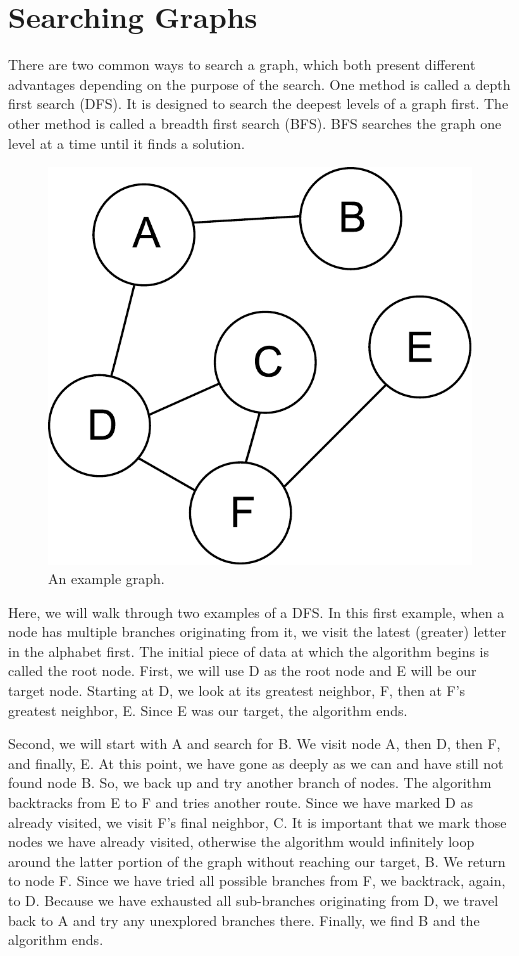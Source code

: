 \section*{Searching Graphs}
There are two common ways to search a graph, which both present different advantages depending on the purpose of the search.
One method is called a depth first search (DFS).  It is designed to search the deepest levels of a graph first.
The other method is called a breadth first search (BFS).  BFS searches the graph one level at a time until it finds a solution.
\begin{figure}[h]
\centering
\includegraphics[width=.5\textwidth]{graph.pdf}
\caption{An example graph.}
\label{fig:bfs_dfs_graph}
\end{figure}


Here, we will walk through two examples of a DFS.
In this first example, when a node has multiple branches originating from it, we visit the latest (greater) letter in the alphabet first. The initial piece of data at which the algorithm begins is called the root node.
First, we will use D as the root node and E will be our target node.
Starting at D, we look at its greatest neighbor, F, then at F's greatest neighbor, E.
Since E was our target, the algorithm ends.

Second, we will start with A and search for B.
We visit node A, then D, then F, and finally, E.
At this point, we have gone as deeply as we can and have still not found node B.
So, we back up and try another branch of nodes.
The algorithm backtracks from E to F and tries another route.
Since we have marked D as already visited, we visit F's final neighbor, C. It is important that we mark those nodes we have already visited, otherwise the algorithm would infinitely loop around the latter portion of the graph without reaching our target, B.
We return to node F. Since we have tried all possible branches from F, we backtrack, again, to D.
Because we have exhausted all sub-branches originating from D, we travel back to A and try any unexplored branches there.
Finally, we find B and the algorithm ends.

